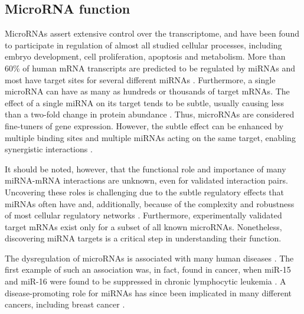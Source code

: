 \subsection{MicroRNA function}\label{microrna-function}

MicroRNAs assert extensive control over the transcriptome, and have been found
to participate in regulation of almost all studied cellular processes,
including embryo development, cell proliferation, apoptosis and metabolism.
More than 60\% of human mRNA transcripts are predicted to be regulated by
miRNAs and most have target sites for several different miRNAs
\citep{Friedman2009}. Furthermore, a single microRNA can have as many as hundreds or
thousands of target mRNAs. The effect of a single miRNA on its target tends to
be subtle, usually causing less than a two-fold change in protein abundance
\citep{Baek2008}. Thus, microRNAs are considered fine-tuners of gene expression.
However, the subtle effect can be enhanced by multiple binding sites and
multiple miRNAs acting on the same target, enabling synergistic
interactions \citep{Bartel2009}.



It should be noted, however, that the functional role and importance of many
miRNA-mRNA interactions are unknown, even for validated interaction pairs.
Uncovering these roles is challenging due to the subtle regulatory effects
that miRNAs often have and, additionally, because of the complexity and
robustness of most cellular regulatory networks \citep{Bartel2009}.
Furthermore, experimentally validated target mRNAs exist only for a subset of
all known microRNAs. Nonetheless, discovering miRNA targets is a critical
step in understanding their function.

The dysregulation of microRNAs is associated with many human diseases
\citep{Jiang2009,VAIHDATÄMÄREFE}. The first example of such an association was, in
fact, found in cancer, when miR-15 and miR-16 were found to be suppressed in
chronic lymphocytic leukemia \citep{Musilova2015}. A disease-promoting role
for miRNAs has since been implicated in many different cancers, including
breast cancer \citep{Melo2011}.





